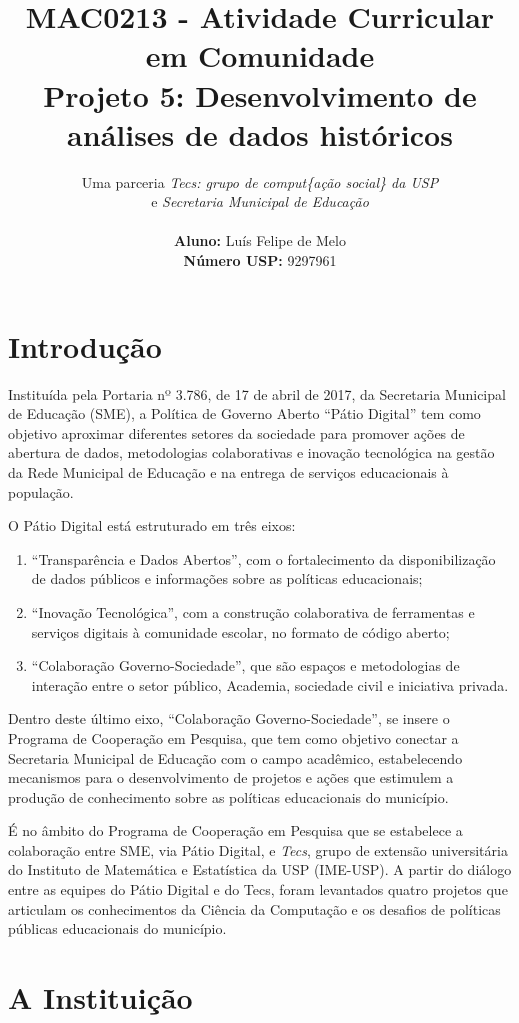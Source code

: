 \documentclass{article}
\title{\textbf{MAC0213 - Atividade Curricular em Comunidade \\ Projeto 5: Desenvolvimento de análises de dados históricos}}
\author{
	Uma parceria \textit{Tecs: grupo de comput\{ação social\} da USP} \\ e \textit{Secretaria Municipal de Educação} \\
    \\
    \textbf{Aluno:} Luís Felipe de Melo  \\
    \textbf{Número USP:} 9297961
    }
\date{}
\begin{document}
\maketitle

\section{Introdução}

Instituída pela Portaria nº 3.786, de 17 de abril de 2017, da Secretaria Municipal de Educação (SME), a Política de Governo Aberto “Pátio Digital” tem como objetivo aproximar diferentes setores da sociedade para promover ações de abertura de dados, metodologias colaborativas e inovação tecnológica na gestão da Rede Municipal de Educação e na entrega de serviços educacionais à população.

O Pátio Digital está estruturado em três eixos: 

\begin{enumerate}
\item “Transparência e Dados Abertos”, com o fortalecimento da disponibilização de dados públicos e informações sobre as políticas educacionais;
\item “Inovação Tecnológica”, com a construção colaborativa de ferramentas e serviços digitais à comunidade escolar, no formato de código aberto;
\item “Colaboração Governo-Sociedade”, que são espaços e metodologias de interação entre o setor público, Academia, sociedade civil e iniciativa privada.
\end{enumerate}

Dentro deste último eixo, “Colaboração Governo-Sociedade”, se insere o Programa de Cooperação em Pesquisa, que tem como objetivo conectar a Secretaria Municipal de Educação com o campo acadêmico, estabelecendo mecanismos para o desenvolvimento de projetos e ações que estimulem a produção de conhecimento sobre as políticas educacionais do município. 

É no âmbito do Programa de Cooperação em Pesquisa que se estabelece a colaboração entre SME, via Pátio Digital, e \textit{Tecs}, grupo de extensão universitária do Instituto de Matemática e Estatística da USP (IME-USP). A partir do diálogo entre as equipes do Pátio Digital e do Tecs, foram levantados quatro projetos que articulam os conhecimentos da Ciência da Computação e os desafios de políticas públicas educacionais do município. 

\section{A Instituição}
\end{document}
